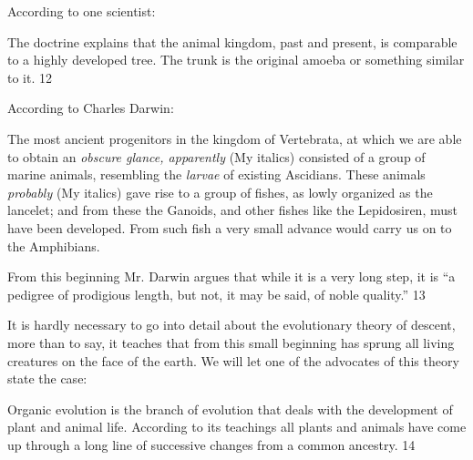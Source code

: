 According to one scientist:

The doctrine explains that the animal kingdom, past and present, is comparable to a highly
developed tree. The trunk is the original amoeba or something similar to it. 12

According to Charles Darwin:

The most ancient progenitors in the kingdom of Vertebrata, at which we are able to obtain an
\textit{obscure glance, apparently} (My italics) consisted of a group of marine animals, resembling
the \textit{larvae} of existing Ascidians. These animals \textit{probably} (My italics) gave rise to a group of
fishes, as lowly organized as the lancelet; and from these the Ganoids, and other fishes like
the Lepidosiren, must have been developed. From such fish a very small advance would
carry us on to the Amphibians.

From this beginning Mr. Darwin argues that while it is a very long step, it is ``a pedigree of
prodigious length, but not, it may be said, of noble quality.'' 13

It is hardly necessary to go into detail about the evolutionary theory of descent, more than to
say, it teaches that from this small beginning has sprung all living creatures on the face of the
earth. We will let one of the advocates of this theory state the case:

Organic evolution is the branch of evolution that deals with the development of plant and
animal life. According to its teachings all plants and animals have come up through a long
line of successive changes from a common ancestry. 14

